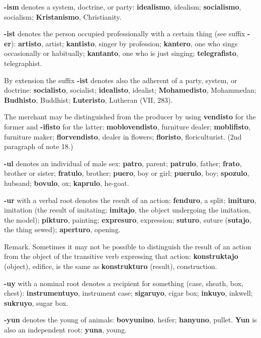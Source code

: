 \textbf{-ism} denotes a system, doctrine, or party: \textbf{idealismo}, idealism; \textbf{socialismo}, socialism; \textbf{Kristanismo}, Christianity. 

\textbf{-ist} denotes the person occupied professionally with a certain thing (see suffix \textbf{-er}): \textbf{artisto}, artist; \textbf{kantisto}, singer by profession; \textbf{kantero}, one who sings occasionally or habitually; \textbf{kantanto}, one who is just singing; \textbf{telegrafisto}, telegraphist. 

By extension the suffix \textbf{-ist} denotes also the adherent of a party, system, or doctrine: \textbf{socialisto}, socialist; \textbf{idealisto}, idealist; \textbf{Mohamedisto}, Mohammedan; \textbf{Budhisto}, Buddhist; \textbf{Luteristo}, Lutheran (VII, 283). 

The merchant may be distinguished from the producer by using \textbf{vendisto} for the former and \textbf{-ifisto} for the latter: \textbf{moblovendisto}, furniture dealer; \textbf{moblifisto}, furniture maker; \textbf{florvendisto}, dealer in flowers; \textbf{floristo}, floriculturist. (2nd paragraph of note 18.) 

\textbf{-ul} denotes an individual of male sex: \textbf{patro}, parent; \textbf{patrulo}, father; \textbf{frato}, brother or sister; \textbf{fratulo}, brother; \textbf{puero}, boy or girl; \textbf{puerulo}, boy; \textbf{spozulo}, hubsand; \textbf{bovulo}, ox; \textbf{kaprulo}, he-goat. 

\textbf{-ur} with a verbal root denotes the result of an action: \textbf{fenduro}, a split; \textbf{imituro}, imitation (the result of imitating; \textbf{imitajo}, the object undergoing the imitation, the model); \textbf{pikturo}, painting; \textbf{expresuro}, expression; \textbf{suturo}, suture (\textbf{sutajo}, the thing sewed); \textbf{aperturo}, opening. 


\small Remark. Sometimes it may not be possible to distinguish the result of an action from the object of the transitive verb expressing that action: \textbf{konstruktajo} (object), edifice, is the same as \textbf{konstrukturo} (result), construction. \normalsize

\textbf{-uy} with a nominal root denotes a recipient for something (case, sheath, box, chest): \textbf{instrumentuyo}, instrument case; \textbf{sigaruyo}, cigar box; \textbf{inkuyo}, inkwell; \textbf{sukruyo}, sugar box. 

\textbf{-yun} denotes the young of animals: \textbf{bovyunino}, heifer; \textbf{hanyuno}, pullet. \textbf{Yun} is also an independent root: \textbf{yuna}, young. 

